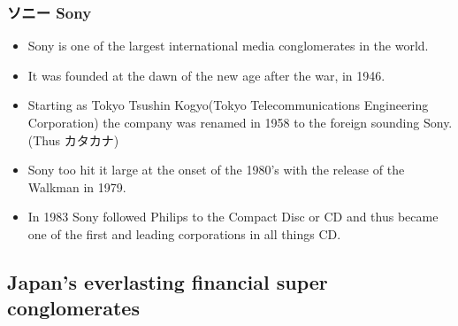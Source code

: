 \documentclass{article}
\newcommand\tabni[1][0.2cm]{\hspace*{#1}}
\begin{document}
\subsubsection{ソニー  \tabni Sony}
\begin{itemize}
\item Sony is one of the largest international media conglomerates in the world.
\item It was founded at the dawn of the new age after the war, in 1946.
\item Starting as Tokyo Tsushin Kogyo(Tokyo Telecommunications Engineering Corporation) the company was renamed in 1958 to the foreign sounding Sony. (Thus カタカナ)
\item Sony too hit it large at the onset of the 1980's with the release of the Walkman in 1979.
\item In 1983 Sony followed Philips to the Compact Disc or CD and thus became one of the first and leading corporations in all things CD.
\end{itemize}
\subsection{Japan's everlasting financial super conglomerates}
\end{document}
